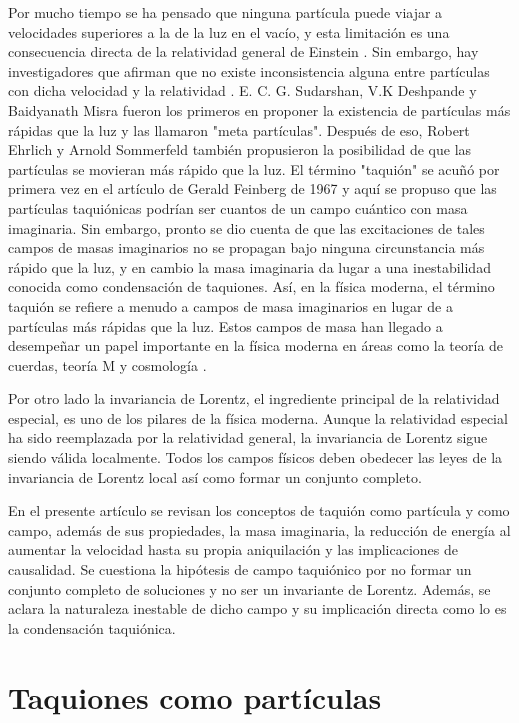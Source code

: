 \documentclass[twocolumn,preprintnumbers,amsmath,amssymb]{revtex4}
\begin{document}
Por mucho tiempo se ha pensado que ninguna partícula puede viajar a velocidades superiores a la de la luz en el vacío, y esta limitación es una consecuencia directa de la relatividad general de Einstein \cite{hill2012einstein}. Sin embargo, hay investigadores que afirman que no existe inconsistencia alguna entre partículas con dicha velocidad y la relatividad \cite{bilaniuk1969particles}. E. C. G. Sudarshan, V.K Deshpande y Baidyanath Misra fueron los primeros en proponer la existencia de partículas más rápidas que la luz y las llamaron "meta partículas". Después de eso, Robert Ehrlich y Arnold Sommerfeld también propusieron la posibilidad de que las partículas se movieran más rápido que la luz. El término "taquión" se acuñó por primera vez en el artículo de Gerald Feinberg de 1967 \cite{feinberg1967possibility} y aquí se propuso que las partículas taquiónicas podrían ser cuantos de un campo cuántico con masa imaginaria. Sin embargo, pronto se dio cuenta de que las excitaciones de tales campos de masas imaginarios no se propagan bajo ninguna circunstancia más rápido que la luz, y en cambio la masa imaginaria da lugar a una inestabilidad conocida como condensación de taquiones. Así, en la física moderna, el término taquión se refiere a menudo a campos de masa imaginarios en lugar de a partículas más rápidas que la luz. Estos campos de masa han llegado a desempeñar un papel importante en la física moderna en áreas como la teoría de cuerdas, teoría M y cosmología \cite{Randall:900484}.

Por otro lado la invariancia de Lorentz, el ingrediente principal de la relatividad especial, es uno de los pilares de la física moderna. Aunque la relatividad especial ha sido reemplazada por la relatividad general, la invariancia de Lorentz sigue siendo válida localmente. Todos los campos físicos deben obedecer las leyes de la invariancia de Lorentz local así  como formar un conjunto completo.


En el presente artículo se revisan los conceptos de taquión como partícula y como campo, además de sus propiedades, la masa imaginaria, la reducción de energía al aumentar la velocidad hasta su propia aniquilación y las implicaciones de causalidad. Se cuestiona la hipótesis de campo taquiónico por no formar un conjunto completo de soluciones y no ser un invariante de Lorentz. Además, se aclara la naturaleza inestable de dicho campo y su implicación directa como lo es la condensación taquiónica.

\section{Taquiones como partículas}
\end{document}
